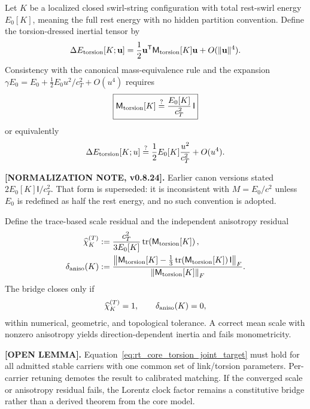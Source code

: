 Let \(K\) be a localized closed swirl-string configuration with total
rest-swirl energy \(E_0[K]\), meaning the full rest energy with no hidden
partition convention.  Define the torsion-dressed inertial tensor by
\begin{align}
    \Delta E_{\rm torsion}[K;\mathbf u]
    =
    \frac12\mathbf u^{\mathsf T}
    \mathsf M_{\rm torsion}[K]
    \mathbf u
    +O(\lVert\mathbf u\rVert^4).
\end{align}
Consistency with the canonical mass-equivalence rule and the expansion
\(\gamma E_0=E_0+\tfrac12E_0u^2/c_T^2+O(u^4)\) requires
\begin{align}
    \boxed{
    \mathsf M_{\rm torsion}[K]
    \stackrel{?}{=}
    \frac{E_0[K]}{c_T^2}\,\mathsf I
    }
    \label{eq:rt_core_torsion_matching_lemma}
\end{align}
or equivalently
\begin{align}
    \Delta E_{\rm torsion}[K;u]
    \stackrel{?}{=}
    \frac12E_0[K]\frac{u^2}{c_T^2}+O(u^4).
\end{align}

\textbf{[NORMALIZATION NOTE, v0.8.24].}
Earlier canon versions stated \(2E_0[K]\mathsf I/c_T^2\).  That form is
superseded: it is inconsistent with \(M=E_0/c^2\) unless \(E_0\) is redefined
as half the rest energy, and no such convention is adopted.

Define the trace-based scale residual and the independent anisotropy residual
\begin{align}
    \widehat{\chi}_K^{(T)}
    &:={c_T^2\over3E_0[K]}
    \operatorname{tr}\!\left(\mathsf M_{\rm torsion}[K]\right),
    \\
    \delta_{\rm aniso}(K)
    &:={\left\lVert
        \mathsf M_{\rm torsion}[K]
        -\tfrac13\operatorname{tr}\!\left(\mathsf M_{\rm torsion}[K]\right)
        \mathsf I
    \right\rVert_F
    \over
    \left\lVert\mathsf M_{\rm torsion}[K]\right\rVert_F}.
    \label{eq:rt_core_torsion_scale_anisotropy_residuals}
\end{align}
The bridge closes only if
\begin{align}
    \widehat{\chi}_K^{(T)}=1,
    \qquad
    \delta_{\rm aniso}(K)=0,
    \label{eq:rt_core_torsion_joint_target}
\end{align}
within numerical, geometric, and topological tolerance.  A correct mean scale
with nonzero anisotropy yields direction-dependent inertia and fails
monometricity.

\textbf{[OPEN LEMMA].}
Equation~\eqref{eq:rt_core_torsion_joint_target} must hold for all admitted
stable carriers with one common set of link/torsion parameters.  Per-carrier
retuning demotes the result to calibrated matching.  If the converged scale or
anisotropy residual fails, the Lorentz clock factor remains a constitutive bridge
rather than a derived theorem from the core model.

